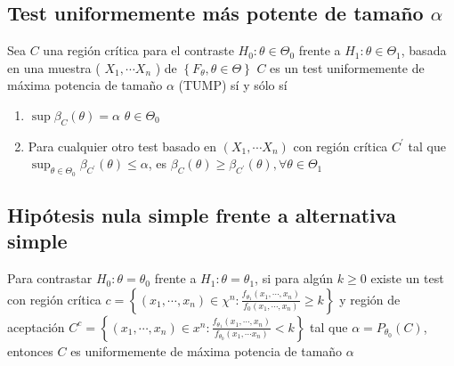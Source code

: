 \subsection{Test uniformemente más potente de tamaño $\alpha$}


\begin{proposición}
Sea $C$ una región crítica para el contraste $H_{0}: \theta \in \Theta_{0}$ frente a $H_{1}: \theta \in \Theta_{1}$, basada en una muestra ( $X_{1}, \cdots X_{n}$ ) de $\left\{F_{\theta}, \theta \in \Theta\right\}$ $C$ es un test uniformemente de máxima potencia de tamaño $\alpha$ (TUMP) sí y sólo sí
\begin{enumerate}
\item $\sup \beta_{C}(\theta)=\alpha$ $\theta \in \Theta_{0}$
\item Para cualquier otro test basado en $\left(X_{1}, \cdots X_{n}\right)$ con región crítica $C^{\prime}$ tal que $\sup _{\theta \in \Theta_{0}} \beta_{C^{\prime}}(\theta) \leq \alpha$, es $\beta_{C}(\theta) \geq \beta_{C^{\prime}}(\theta), \forall \theta \in \Theta_{1}$
\end{enumerate}
\end{proposición}

\subsection{Hipótesis nula simple frente a alternativa simple}

\begin{teorema}  
Para contrastar $H_{0}: \theta=\theta_{0}$ frente a $H_{1}: \theta=\theta_{1}$, si para algún $k \geq 0$ existe un test con región crítica $c=\left\{\left(x_{1}, \cdots, x_{n}\right) \in \chi^{n}: \frac{f_{\theta_{1}}\left(x_{1}, \cdots, x_{n}\right)}{f_{0}\left(x_{1}, \cdots, x_{n}\right)} \geq k\right\}$ y región de aceptación $C^{c}=\left\{\left(x_{1}, \cdots, x_{n}\right) \in x^{n}: \frac{f_{\theta_{1}}\left(x_{1}, \cdots, x_{n}\right)}{f_{\theta_{0}}\left(x_{1}, \cdots x_{n}\right)}<k\right\}$ tal que $\alpha=P_{\theta_{0}}(C)$, entonces $C$ es uniformemente de máxima potencia de tamaño $\alpha$
\end{teorema}

